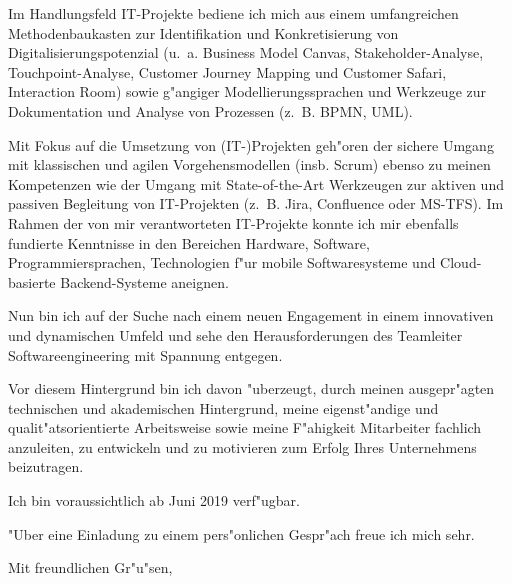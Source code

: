 \documentclass[10pt,a4paper]{dinbrief}
\begin{document}
\begin{letter}
Im Handlungsfeld IT-Projekte bediene ich mich aus einem umfangreichen Methodenbaukasten zur Identifikation und Konkretisierung von Digitalisierungspotenzial (u.~a. Business Model Canvas, Stakeholder-Analyse, Touchpoint-Analyse, Customer Journey Mapping und Customer Safari, Interaction Room) sowie g"angiger Modellierungssprachen und Werkzeuge zur Dokumentation und Analyse von Prozessen (z.~B. BPMN, UML).\clearpage

Mit Fokus auf die Umsetzung von (IT-)Projekten geh"oren der sichere Umgang mit klassischen und agilen Vorgehensmodellen (insb. Scrum) ebenso zu meinen Kompetenzen wie der Umgang mit State-of-the-Art Werkzeugen zur aktiven und passiven Begleitung von IT-Projekten (z.~B. Jira, Confluence oder MS-TFS). Im Rahmen der von mir verantworteten IT-Projekte konnte ich mir ebenfalls fundierte Kenntnisse in den Bereichen Hardware, Software, Programmiersprachen, Technologien f"ur mobile Softwaresysteme und Cloud-basierte Backend-Systeme aneignen.

Nun bin ich auf der Suche nach einem neuen Engagement in einem innovativen und dynamischen Umfeld und sehe den Herausforderungen des Teamleiter Softwareengineering mit Spannung entgegen.

Vor diesem Hintergrund bin ich davon "uberzeugt, durch meinen ausgepr"agten technischen und akademischen Hintergrund, meine eigenst"andige und qualit"atsorientierte Arbeitsweise sowie meine F"ahigkeit Mitarbeiter fachlich anzuleiten, zu entwickeln und zu motivieren zum Erfolg Ihres Unternehmens beizutragen.

Ich bin voraussichtlich ab Juni 2019 verf"ugbar. %

"Uber eine Einladung zu einem pers"onlichen Gespr"ach freue ich mich sehr.

\closing{Mit freundlichen Gr"u"sen,}
\end{letter}
\end{document}
